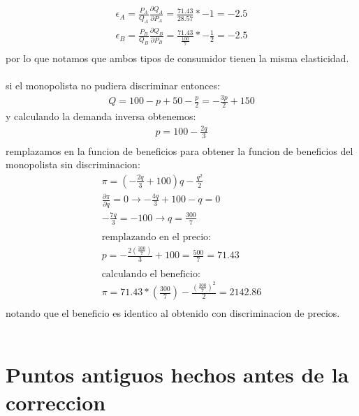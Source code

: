 \documentclass[11pt]{article}
\begin{document}
\begin{flushleft}
\begin{align*}
        \epsilon_A=\frac{P_A}{Q_A}\frac{\partial Q_A}{\partial P_A}=\frac{71.43}{28.57}*-1 =-2.5\\
        \epsilon_B=\frac{P_B}{Q_B}\frac{\partial Q_B}{\partial P_B}=\frac{71.43}{\frac{100}{7}}*-\frac{1}{2}=-2.5\\
    \end{align*}
    por lo que notamos que ambos tipos de consumidor tienen la misma elasticidad.\\~\\
    si el monopolista no pudiera discriminar entonces: 
    \begin{align*}
        Q = 100-p+50-\frac{p}{2}=-\frac{3p}{2}+150
    \end{align*}
    y calculando la demanda inversa obtenemos:
    \begin{align*}
        p=100-\frac{2q}{3}\\
    \end{align*}
    remplazamos en la funcion de beneficios para obtener la funcion de beneficios del monopolista sin discriminacion:
    \begin{align*}
        \pi=(-\frac{2q}{3}+100)q-\frac{q^2}{2}\\
        \frac{\partial \pi}{\partial q} = 0 \to -\frac{4q}{3}+100-q=0\\
        -\frac{7q}{3}=-100 \to q=\frac{300}{7}\\~\\
        \text{remplazando en el precio:}\\
        p=-\frac{2(\frac{300}{7})}{3}+100=\frac{500}{7}=71.43\\~\\
        \text{calculando el beneficio:}\\
        \pi = 71.43*\left(\frac{300}{7}\right)-\frac{\left(\frac{300}{7}\right)^2}{2}=2142.86\\
    \end{align*}
    notando que el beneficio es identico al obtenido con discriminacion de precios.\\~\\
\end{flushleft}


\section{Puntos antiguos hechos antes de la correccion}
\end{document}
